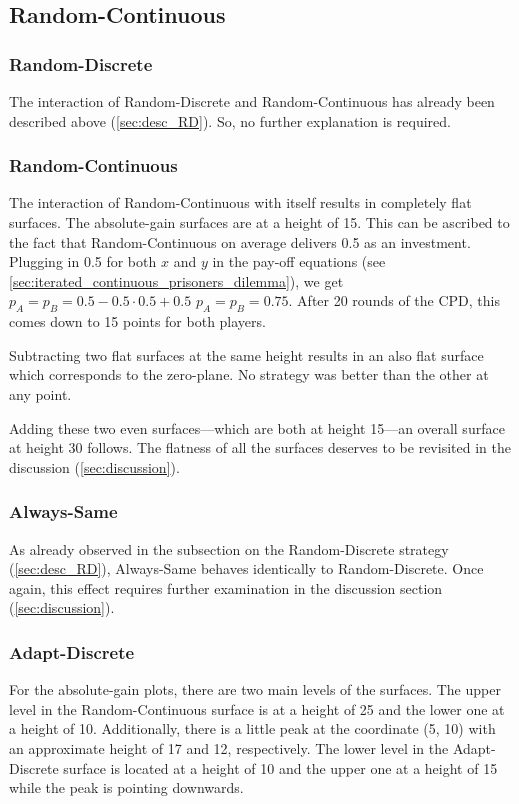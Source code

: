 \documentclass[11pt]{article}
\begin{document}
\subsection{Random-Continuous} \label{sec:desc_RC}

\subsubsection*{Random-Discrete}
	The interaction of Random-Discrete and Random-Continuous has already been described above (\ref{sec:desc_RD}).
	So, no further explanation is required.

\subsubsection*{Random-Continuous}
	The interaction of Random-Continuous with itself results in completely flat surfaces.
	The absolute-gain surfaces are at a height of 15.
	This can be ascribed to the fact that Random-Continuous on average delivers 0.5 as an investment.
	Plugging in 0.5 for both $x$ and $y$ in the pay-off equations (see \ref{sec:iterated_continuous_prisoners_dilemma}), we get $p_A = p_B = 0.5 - 0.5 \cdot 0.5 + 0.5$ \textrightarrow $p_A = p_B = 0.75$.
	After 20 rounds of the CPD, this comes down to 15 points for both players.

	Subtracting two flat surfaces at the same height results in an also flat surface which corresponds to the zero-plane.
	No strategy was better than the other at any point.

	Adding these two even surfaces---which are both at height 15---an overall surface at height 30 follows.
	The flatness of all the surfaces deserves to be revisited in the discussion (\ref{sec:discussion}).

\subsubsection*{Always-Same}
	As already observed in the subsection on the Random-Discrete strategy (\ref{sec:desc_RD}), Always-Same behaves identically to Random-Discrete.
	Once again, this effect requires further examination in the discussion section (\ref{sec:discussion}).

\subsubsection*{Adapt-Discrete}
	For the absolute-gain plots, there are two main levels of the surfaces.
	The upper level in the Random-Continuous surface is at a height of 25 and the lower one at a height of 10.
	Additionally, there is a little peak at the coordinate (5, 10) with an approximate height of 17 and 12, respectively.
	The lower level in the Adapt-Discrete surface is located at a height of 10 and the upper one at a height of 15 while the peak is pointing downwards.
\end{document}
